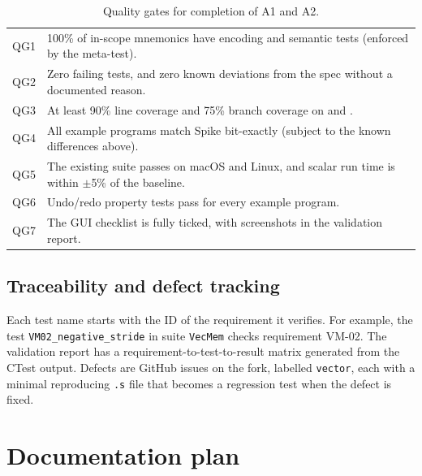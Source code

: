 \documentclass[11pt]{article}
\begin{document}
\begin{table}[H]
\centering\small
\caption{Quality gates for completion of A1 and A2.}\label{tab:gates}
\begin{tabularx}{\textwidth}{@{}L{1.0cm}Y@{}}
\toprule
QG1 & 100\% of in-scope mnemonics have encoding and semantic tests (enforced by the meta-test). \\
QG2 & Zero failing tests, and zero known deviations from the spec without a documented reason. \\
QG3 & At least 90\% line coverage and 75\% branch coverage on  and . \\
QG4 & All example programs match Spike bit-exactly (subject to the known differences above). \\
QG5 & The existing suite passes on macOS and Linux, and scalar run time is within $\pm$5\% of the baseline. \\
QG6 & Undo/redo property tests pass for every example program. \\
QG7 & The GUI checklist is fully ticked, with screenshots in the validation report. \\
\bottomrule
\end{tabularx}
\end{table}

\subsection{Traceability and defect tracking}\label{sec:trace}
Each test name starts with the ID of the requirement it verifies. For example, the test
\texttt{VM02\_negative\_stride} in suite \texttt{VecMem} checks requirement VM-02. The validation report has a
requirement-to-test-to-result matrix generated from the CTest output. Defects are GitHub issues on
the fork, labelled \texttt{vector}, each with a minimal reproducing \texttt{.s} file that becomes a
regression test when the defect is fixed.

\section{Documentation plan}\label{sec:docs}
\end{document}
